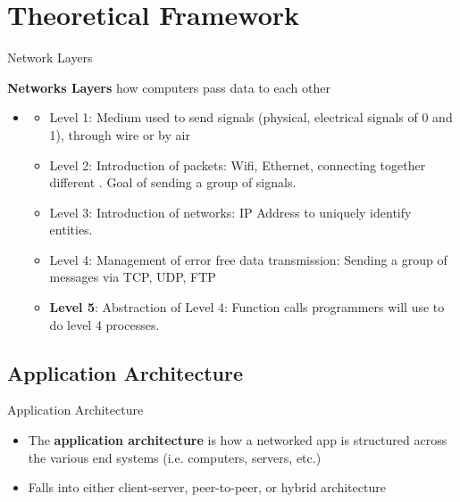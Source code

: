 \documentclass{beamer}
\begin{document}

\section{Theoretical Framework}

        \begin{frame}{Network Layers}

         \textbf{Networks Layers} how computers pass data to each other
        \begin{itemize}
            \item \begin{itemize}
            \item Level 1: Medium used to send signals (physical, electrical signals of 0 and 1), through wire or by air
            \item Level 2: Introduction of packets: Wifi, Ethernet, connecting together different . Goal of sending a group of signals.
            \item Level 3: Introduction of networks: IP Address to uniquely identify entities. 
            \item Level 4: Management of error free data transmission: Sending a group of messages via TCP, UDP, FTP
            \item \textbf{Level 5}: Abstraction of Level 4: Function calls programmers will use to do level 4 processes.
            \end{itemize}
        \end{itemize}
    \end{frame}
    
    \subsection{Application Architecture}

    \begin{frame}{Application Architecture}
        \begin{itemize}
            \item The \textbf{application architecture} is how a networked app is structured across the various end systems (i.e. computers, servers, etc.) \cite{kurose}
            \item Falls into either client-server, peer-to-peer, or hybrid architecture
        \end{itemize}
    \end{frame}
       
\end{document}
